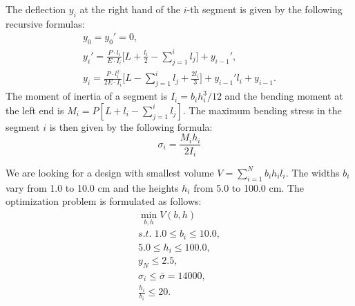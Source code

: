 \documentclass[runningheads,a4paper]{llncs}
\begin{document}
The deflection $y_i$ at the right hand of the $i$-th segment is given by the following recursive formulas:
\begin{displaymath}
  \begin{array}{c}
    y_0=y_0'=0, \\
    y_i'=\frac{P\cdot l_i}{E\cdot I_i}\Big[ L+\frac{l_i}{2}-\sum\limits_{j=1}^i l_j\Big]+y_{i-1}', \\
    y_i=\frac{P\cdot l_i^2}{2E\cdot I_i}\Big[L-\sum\limits_{j=1}^i l_j + \frac{2l_i}{3}\Big]+y_{i-1}'l_i+y_{i-1}.
  \end{array}
\end{displaymath}
The moment of inertia of a segment is $I_i={b_i h_i^3}/{12}$ and the bending moment at the left end is $M_i=P[L+l_i- \sum_{j=1}^{i}  l_j ]$. The maximum bending stress in the segment $i$ is then given by the following formula:
\begin{displaymath}
  \sigma_i=\frac{M_i h_i}{2I_i}
\end{displaymath}

We are looking for a design with smallest volume $V = \sum_{i=1}^N b_i h_i l_i$. The widths $b_i$ vary from 1.0 to 10.0 cm and the heights $h_i$ from 5.0 to 100.0 cm. The optimization problem is formulated as follows:
\begin{displaymath}
  \begin{array}{c}
    \min\limits_{ b,  h}V( b,  h) \\
    s.t.\;1.0\le b_i \le 10.0, \\
    5.0 \le h_i \le 100.0, \\
    y_N\le 2.5, \\
    \sigma_i \le \bar{\sigma}=14000, \\
    \frac{h_i}{b_i}\le 20.
  \end{array}
\end{displaymath}
\end{document}
